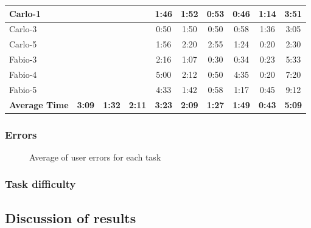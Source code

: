 \begin{tabularx}{\linewidth}{l|c|c|c|c|c|c|c|c|c}
        Carlo-1 &  &  &  & 1:46 & 1:52 & 0:53 & 0:46 & 1:14 & 3:51 \\ \midrule
        Carlo-3 &  &  &  & 0:50 & 1:50 & 0:50 & 0:58 & 1:36 & 3:05 \\ \midrule
        Carlo-5 &  &  &  & 1:56 & 2:20 & 2:55 & 1:24 & 0:20 & 2:30 \\ \midrule
        Fabio-3 &  &  &  & 2:16 & 1:07 & 0:30 & 0:34 & 0:23 & 5:33 \\ \midrule
        Fabio-4 &  &  &  & 5:00 & 2:12 & 0:50 & 4:35 & 0:20 & 7:20 \\ \midrule
        Fabio-5 &  &  &  & 4:33 & 1:42 & 0:58 & 1:17 & 0:45 & 9:12 \\ \midrule
        \textbf{Average Time} & \textbf{3:09} & \textbf{1:32} & \textbf{2:11} & \textbf{3:23} & \textbf{2:09} & \textbf{1:27} & \textbf{1:49} & \textbf{0:43} & \textbf{5:09}
    \end{tabularx}

\subsubsection{Errors}
    \begin{figure}[!ht]
        \begin{minipage}{\linewidth}
            \centering
            \captionsetup{justification=centering}
            \caption{Average of user errors for each task}
            \label{BarsErrors}
        \end{minipage}
    \end{figure}

\subsubsection{Task difficulty}


\subsection{Discussion of results}
